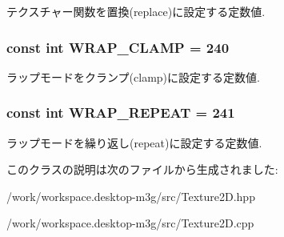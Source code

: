 テクスチャー関数を置換(replace)に設定する定数値. \hypertarget{classm3g_1_1Texture2D_e36d8facf5b60eb6c59888121731c438}{
\subsubsection[{WRAP\_\-CLAMP}]{\setlength{\rightskip}{0pt plus 5cm}const int {\bf WRAP\_\-CLAMP} = 240}}
\label{classm3g_1_1Texture2D_e36d8facf5b60eb6c59888121731c438}


ラップモードをクランプ(clamp)に設定する定数値. \hypertarget{classm3g_1_1Texture2D_b37ff061b9fb272284c4c389deec9266}{
\subsubsection[{WRAP\_\-REPEAT}]{\setlength{\rightskip}{0pt plus 5cm}const int {\bf WRAP\_\-REPEAT} = 241}}
\label{classm3g_1_1Texture2D_b37ff061b9fb272284c4c389deec9266}


ラップモードを繰り返し(repeat)に設定する定数値. 

このクラスの説明は次のファイルから生成されました:\begin{CompactItemize}
\item 
/work/workspace.desktop-m3g/src/Texture2D.hpp\item 
/work/workspace.desktop-m3g/src/Texture2D.cpp\end{CompactItemize}
